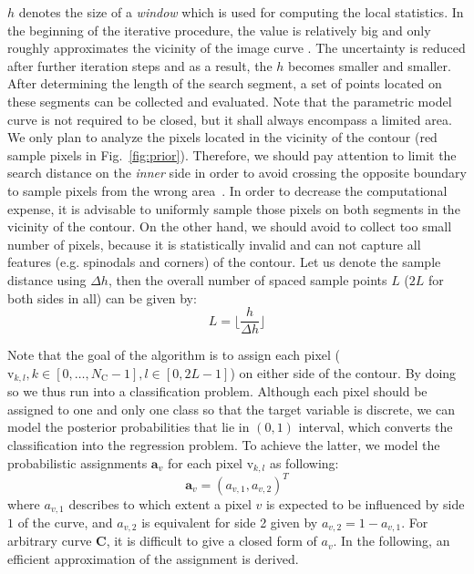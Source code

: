 $h$ denotes the size of a \textit{window} which is used for computing
the local statistics. In the beginning of the iterative procedure, the value
is relatively big and only roughly approximates the vicinity of the image curve
. The
uncertainty is reduced after further iteration steps and as a result, the $h$ becomes smaller and
smaller. After determining the length of the search segment, 
a set of points located on these segments can be collected and
evaluated. Note that the parametric model curve is not required to be
closed, but it shall always encompass a limited area. We only plan to
analyze the pixels located in the vicinity of the contour (red sample
pixels in Fig.~\ref{fig:prior}). Therefore,
we should pay attention to limit the search distance on the
\textit{inner} side in order to avoid crossing the opposite
boundary to sample pixels from the wrong area~\cite{panin2006fully}. In order to
decrease the computational expense, it is advisable to uniformly sample those
pixels on both segments in the vicinity of the contour. On the other
hand, we should avoid to collect too small number of pixels, because
it is statistically invalid and can not
capture all features (e.g. spinodals and corners) of the contour. Let us denote the
sample distance using $\Delta h$, then the overall number of spaced
sample points $L$ ($2L$ for both sides in all) can be given by:
\begin{equation}
  \label{eq:sample}
  L = \lfloor \frac{h}{\Delta h} \rfloor
\end{equation}

Note that the goal of the algorithm is to assign each pixel
($\mathrm{v}_{k,l}, k \in [0,\ldots,N_{\mathrm{C}}-1], l \in [0,
2L-1]$) on either side of the contour. By doing so we thus run into a
classification problem.
Although each pixel should be assigned to one and only
one class so that the target variable is discrete, we can model the
posterior probabilities that lie in $(0,1)$ interval, which converts the classification into the regression problem. To achieve the latter, we model the probabilistic
assignments $\mathbf{a}_{v}$ for each pixel $\mathrm{v}_{k,l}$ as following:
\begin{equation}
  \label{eq:pa}
  \mathbf{a}_v  = (a_{v,1}, a_{v,2})^T
\end{equation}
where $a_{v,1}$ describes to which extent a pixel $v$ is expected to
be influenced by side $1$ of the curve, and $a_{v,2}$ is equivalent
for side 2 given by $a_{v,2} = 1- a_{v,1}$. For arbitrary curve
$\mathbf{C}$, it is difficult to give a closed form of $a_v$. In the
following, an efficient approximation of the assignment is derived.

